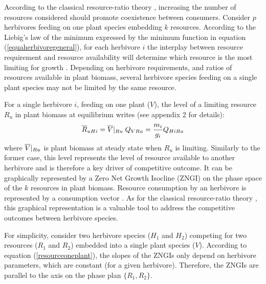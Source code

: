\documentclass[12pt]{article}
\newcommand\barre[1]{\overline{\rule{0pt}{1.5ex}#1}}
\begin{document}
According to the classical resource-ratio theory \citep{Tilman1982}, increasing the number of resources considered should promote coexistence between consumers.  
Consider $p$ herbivores feeding on one plant species embedding $k$ resources. According to the Liebig's law of the minimum expressed by the minimum function in equation (\ref{equaherbivoregeneral}), for each herbivore $i$ the interplay between resource requirement and resource availability will determine which resource is the most limiting for growth \citep{Grover1997}. Depending on herbivore requirements, and ratios of resources available in plant biomass, several herbivore species feeding on a single plant species may not be limited by the same resource. %
\par
For a single herbivore $i$, feeding on one plant ($V$), the level of a limiting resource $R_u$ %
in plant biomass at equilibrium writes (see appendix 2 for details):
\begin{equation}\label{resourceoneplant}
\barre{R}_{uHi}=\barre{V}|_{Ru}\; Q_{VRu} =\frac{m_i}{g_i}Q_{HiRu} 
\end{equation}
where $\barre{V}|_{Ru}$ is plant biomass at steady state when $R_u$ is limiting. %
Similarly to the former case, this level represents the level of resource available to another herbivore and is therefore a key driver of competitive outcome. It can be graphically represented by a Zero Net Growth Isocline (ZNGI) on the phase space of the $k$ resources in plant biomass. %
Resource consumption by an herbivore is represented by a consumption vector \citep{Tilman1980}. As for the classical resource-ratio theory \citep{Tilman1982}, %
this graphical representation is a valuable tool to address the competitive outcomes between herbivore species. \par
For simplicity, consider two herbivore species ($H_1$ and $H_2$) competing for two resources ($R_1$ and $R_2$) embedded into a single plant species ($V$). According to equation (\ref{resourceoneplant}), the slopes of the ZNGIs only depend on herbivore parameters, which are constant (for a given herbivore). Therefore, the ZNGIs are parallel to the axis on the phase plan $\{R_1,R_2\}$. %
\end{document}
